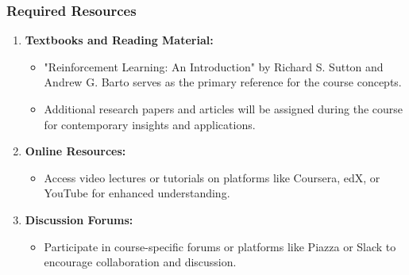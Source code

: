 \documentclass[aspectratio=169]{beamer}
\begin{document}
\begin{frame}[fragile]
    \frametitle{Required Resources}
    \begin{enumerate}
        \item \textbf{Textbooks and Reading Material:}
            \begin{itemize}
                \item "Reinforcement Learning: An Introduction" by Richard S. Sutton and Andrew G. Barto serves as the primary reference for the course concepts.
                \item Additional research papers and articles will be assigned during the course for contemporary insights and applications.
            \end{itemize}
        \item \textbf{Online Resources:}
            \begin{itemize}
                \item Access video lectures or tutorials on platforms like Coursera, edX, or YouTube for enhanced understanding.
            \end{itemize}
        \item \textbf{Discussion Forums:}
            \begin{itemize}
                \item Participate in course-specific forums or platforms like Piazza or Slack to encourage collaboration and discussion.
            \end{itemize}
    \end{enumerate}
\end{frame}
\end{document}
